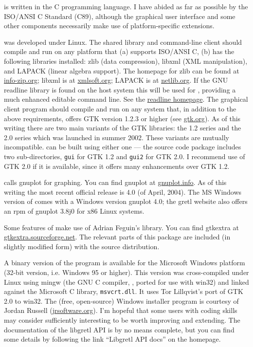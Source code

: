  is written in the C programming language.  I have abided
as far as possible by the ISO/ANSI C Standard (C89), although the
graphical user interface and some other components necessarily make
use of platform-specific extensions.
  
 was developed under Linux. The shared library and
command-line client should compile and run on any platform that (a)
supports ISO/ANSI C, (b) has the following libraries installed: zlib
(data compression), libxml (XML manipulation), and LAPACK (linear
algebra support). The homepage for zlib can be found at
\href{http://www.info-zip.org/pub/infozip/zlib/}{info-zip.org}; libxml
is at \href{http://xmlsoft.org/}{xmlsoft.org}; LAPACK is at
\href{http://www.netlib.org/lapack/}{netlib.org}. If the GNU readline
library is found on the host system this will be used for
, providing a much enhanced editable command line.  See
the
\href{http://cnswww.cns.cwru.edu/~chet/readline/rltop.html}{readline
  homepage}.  The graphical client program should compile and run on
any system that, in addition to the above requirements, offers GTK
version 1.2.3 or higher (see \href{http://www.gtk.org/}{gtk.org}).  As
of this writing there are two main variants of the GTK libraries: the
1.2 series and the 2.0 series which was launched in summer 2002.
These variants are mutually incompatible.   can be built
using either one --- the source code package includes two
sub-directories, \verb+gui+ for GTK 1.2 and \verb+gui2+ for GTK 2.0.
I recommend use of GTK 2.0 if it is available, since it offers many
enhancements over GTK 1.2.
  
 calls gnuplot for graphing. You can find gnuplot at
\href{http://www.gnuplot.info/}{gnuplot.info}.  As of this writing the
most recent official release is 4.0 (of April, 2004).  The MS Windows
version of  comes with a Windows version gnuplot 4.0; the
gretl website also offers an rpm of gnuplot 3.8j0 for x86 Linux
systems.
  
Some features of  make use of Adrian Feguin's
 library. You can find gtkextra at
\href{http://gtkextra.sourceforge.net/}{gtkextra.sourceforge.net}.
The relevant parts of this package are included (in slightly modified
form) with the  source distribution.
  
A binary version of the program is available for the Microsoft Windows
platform (32-bit version, i.e. Windows 95 or higher). This version was
cross-compiled under Linux using mingw (the GNU C compiler, ,
ported for use with win32) and linked against the Microsoft C library,
\verb+msvcrt.dll+.  It uses Tor Lillqvist's port of GTK 2.0 to win32.
The (free, open-source) Windows installer program is courtesy of
Jordan Russell (\href{http://www.jrsoftware.org/}{jrsoftware.org}).
I'm hopeful that some users with coding skills may consider
 sufficiently interesting to be worth improving and
extending.  The documentation of the libgretl API is by no means
complete, but you can find some details by following the link
``Libgretl API docs'' on the  homepage.


